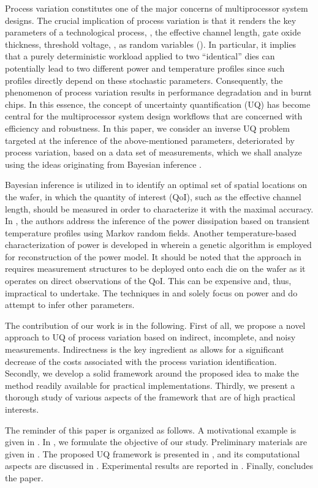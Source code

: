 Process variation constitutes one of the major concerns of multiprocessor system designs. The crucial implication of process variation is that it renders the key parameters of a technological process, \eg, the effective channel length, gate oxide thickness, threshold voltage, \etc, as random variables (\rvs). In particular, it implies that a purely deterministic workload applied to two ``identical'' dies can potentially lead to two different power and temperature profiles since such profiles directly depend on these stochastic parameters. Consequently, the phenomenon of process variation results in performance degradation and in burnt chips. In this essence, the concept of uncertainty quantification (UQ) has become central for the multiprocessor system design workflows that are concerned with efficiency and robustness. In this paper, we consider an inverse UQ problem targeted at the inference of the above-mentioned parameters, deteriorated by process variation, based on a data set of measurements, which we shall analyze using the ideas originating from Bayesian inference \cite{gelman2004}.

Bayesian inference is utilized in \cite{zhang2010} to identify an optimal set of spatial locations on the wafer, in which the quantity of interest (QoI), such as the effective channel length, should be measured in order to characterize it with the maximal accuracy. In \cite{paek2012}, the authors address the inference of the power dissipation based on transient temperature profiles using Markov random fields. Another temperature-based characterization of power is developed in \cite{mesa-martinez2007} wherein a genetic algorithm is employed for reconstruction of the power model. It should be noted that the approach in \cite{zhang2010} requires measurement structures to be deployed onto each die on the wafer as it operates on direct observations of the QoI. This can be expensive and, thus, impractical to undertake. The techniques in \cite{paek2012} and \cite{mesa-martinez2007} solely focus on power and do attempt to infer other parameters.

The contribution of our work is in the following. First of all, we propose a novel approach to UQ of process variation based on indirect, incomplete, and noisy measurements. Indirectness is the key ingredient as allows for a significant decrease of the costs associated with the process variation identification. Secondly, we develop a solid framework around the proposed idea to make the method readily available for practical implementations. Thirdly, we present a thorough study of various aspects of the framework that are of high practical interests.

The reminder of this paper is organized as follows. A motivational example is given in . In , we formulate the objective of our study. Preliminary materials are given in . The proposed UQ framework is presented in , and its computational aspects are discussed in . Experimental results are reported in . Finally,  concludes the paper.
